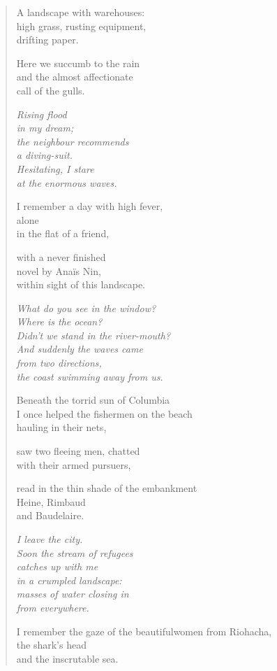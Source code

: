 \clearpage


\begin{verse}

A landscape with warehouses:\\
high grass, rusting equipment,\\
drifting paper.

Here we succumb to the rain\\
and the almost affectionate\\
call of the gulls.

{\itshape
Rising flood\\
in my dream;\\
the neighbour recommends\\
a diving-suit.\\
Hesitating, I stare\\
at the enormous waves.}

I remember a day with high fever,\\
alone\\
in the flat of a friend,

with a never finished\\
novel by Anaïs Nin,\\
within sight of this landscape.

{\itshape
What do you see in the window?\\
Where is the ocean?\\
Didn't we stand in the river-mouth?\\
And suddenly the waves came\\
from two directions,\\
the coast swimming away from us.}

Beneath the torrid sun of Columbia\\
I once helped the fishermen on the beach\\
hauling in their nets,

saw two fleeing men, chatted\\
with their armed pursuers,

read in the thin shade of the embankment\\
Heine, Rimbaud\\
and Baudelaire.

{\itshape
I leave the city.\\
Soon the stream of refugees\\
catches up with me\\
in a crumpled landscape:\\
masses of water closing in\\
from everywhere.}

I remember the gaze of the beautiful\verselinebreak women from Riohacha,\\
the shark's head\\
and the inscrutable sea.

\end{verse}

